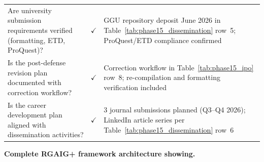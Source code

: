 \begin{xltabular}{\textwidth}{@{} X c X @{}}
\addlinespace
Are university submission requirements verified (formatting, ETD, ProQuest)?                                  & $\checkmark$ & GGU repository deposit June 2026 in Table~\ref{tab:phase15_dissemination} row~5; ProQuest/ETD compliance confirmed \\
\addlinespace
Is the post-defense revision plan documented with correction workflow?                                        & $\checkmark$ & Correction workflow in Table~\ref{tab:phase15_ipo} row~8; re-compilation and formatting verification included \\
\addlinespace
Is the career development plan aligned with dissemination activities?                                         & $\checkmark$ & 3 journal submissions planned (Q3--Q4 2026); LinkedIn article series per Table~\ref{tab:phase15_dissemination} row~6 \\
\end{xltabular}
\endgroup

\vspace{1.5em}


\noindent\textbf{Complete RGAIG+ framework architecture showing.}

